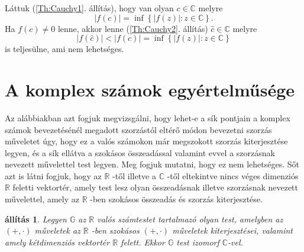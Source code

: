 \documentclass[9pt, a4paper, showtrims]{memoir}
\makeatletter
\renewenvironment{proof}[1][\proofname]
    {\par\pushQED{\qed}%
    \normalfont \topsep6\p@\@plus6\p@\relax
    \trivlist
    \item[\hskip\labelsep
        \itshape
    #1\@addpunct{:}]\ignorespaces}
    {\popQED\endtrivlist\@endpefalse}
\theoremstyle{plain}
\newtheorem{proposition}{állítás}[chapter]
\theoremstyle{remark}
\theoremstyle{definition}
\makeatother
\begin{document}
\begin{proof}
	Láttuk (\ref{Th:Cauchy1}. állítás), hogy van olyan $c\in \mathbb{C}$ melyre
	\[
		\left| f\left( c\right) \right| =\inf \left\{ \left| f\left( z\right)
		\right| :z\in \mathbb{C}\right\} \text{.}
	\]
	Ha $f(c)\neq 0$ lenne, akkor lenne (\ref{Th:Cauchy2}. állítás) $\hat{c}\in \mathbb{C}$ melyre
	\[
		\left| f\left( \hat{c}\right) \right| <\left| f\left( c\right) \right| =\inf
		\left\{ \left| f\left( z\right) \right| :z\in \mathbb{C}\right\}
	\]
	is teljesülne, ami nem lehetséges.
\end{proof}

\section{A komplex számok egyértelműsége}

Az alábbiakban azt fogjuk megvizsgálni, hogy lehet-e a sík pontjain
a komplex számok bevezetésénél megadott szorzástól eltérő
módon bevezetni szorzás műveletet úgy, hogy ez a valós számokon
már megszokott szorzás kiterjesztése legyen, és a sík ellátva
a szokásos összeadással valamint evvel a szorzásnak nevezett művelettel test legyen.
Meg fogjuk mutatni, hogy ez nem lehetséges.
Sőt
azt is látni fogjuk, hogy az $\mathbb{R}$ -től illetve a $\mathbb{C}$ -től
eltekintve nincs véges dimenziós $\mathbb{R}$ feletti vektortér, amely
test lesz olyan összeadásnak illetve szorzásnak nevezett művelettel,
amely az $\mathbb{R}$ -ben szokásos összeadás és szorzás kiterjesztése.

\begin{proposition}
	\label{Th:CUnique1}Legyen $\mathbb{G}$ az $\mathbb{R}$ valós számtestet
	tartalmazó olyan test, amelyben az $\left( +,\cdot \right) $ műveletek az $\mathbb{R}$ -ben szokásos $\left( +,\cdot \right) $ műveletek kiterjesztései, valamint amely kétdimenziós vektortér $\mathbb{R}$ felett.
	Ekkor $\mathbb{G}$ test izomorf $\mathbb{C}$-vel.
\end{proposition}
\end{document}
